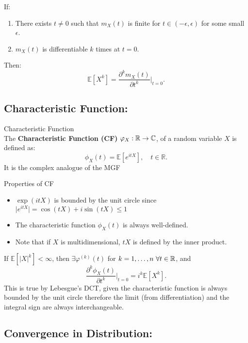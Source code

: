\begin{prf}
\begin{rmk}{}
If:
\begin{enumerate}
    \item There exists $t \neq 0$ such that $m_X(t)$ is finite for $t \in (-\epsilon, \epsilon)$ for some small $\epsilon$.
    \item $m_X(t)$ is differentiable $k$ times at $t = 0$.
\end{enumerate}
Then:
\[
\mathbb{E}[X^k] = \frac{\partial^k m_X(t)}{\partial t^k} \bigg|_{t=0}.
\]
\end{rmk}


\subsection{Characteristic Function:}

\begin{df}{Characteristic Function}\\
The \textbf{Characteristic Function (CF)} $\varphi_X: {\mathbb{R}}\rightarrow \mathbb{C}$, of a random variable $X$ is defined as:
\[
\phi_X(t) = \mathbb{E}[e^{itX}], \quad t \in \mathbb{R}.
\]
It is the complex analogue of the MGF
\end{df}
\begin{prop}{Properties of CF}
\begin{itemize}
    \item $\exp(itX)$ is bounded by the unit circle since $\lvert e^{itX} \rvert = \cos(tX) + i\sin(tX) \leq 1$ 
    \item The characteristic function $\phi_X(t)$ is always well-defined.
    \item Note that if $X$ is multidimensional, $tX$ is defined by the inner product.
\end{itemize}	
\end{prop}

\begin{thm}{}
If $\mathbb{E}[|X|^k] < \infty$, then $\exists \varphi^{(k)}(t)$ for $k = 1, \dots, n \ \forall t\in {\mathbb{R}}$, and  
\[
\frac{\partial^k \phi_X(t)}{\partial t^k} \bigg|_{t=0} = i^k \mathbb{E}[X^k].
\]
This is true by Lebesgue's DCT, given the characteristic function is always bounded by the unit circle therefore the limit (from differentiation) and the integral sign are always interchangeable. 
\end{thm}


\subsection{Convergence in Distribution:}



\end{prf}
